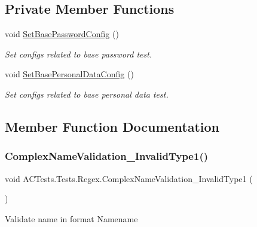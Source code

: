 \subsection*{Private Member Functions}
\begin{DoxyCompactItemize}
\item 
void \mbox{\hyperlink{class_a_c_tests_1_1_tests_1_1_regex_a718c10ab40c5e07d59790980bcdca01b}{Set\+Base\+Password\+Config}} ()
\begin{DoxyCompactList}\small\item\em Set configs related to base password test. \end{DoxyCompactList}\item 
void \mbox{\hyperlink{class_a_c_tests_1_1_tests_1_1_regex_a25d9c579fa5463bc64f843fbb5a9ea01}{Set\+Base\+Personal\+Data\+Config}} ()
\begin{DoxyCompactList}\small\item\em Set configs related to base personal data test. \end{DoxyCompactList}\end{DoxyCompactItemize}


\subsection{Member Function Documentation}
\mbox{\label{class_a_c_tests_1_1_tests_1_1_regex_aed8771049664094309007e7d9d57d8ef}} 
\subsubsection{\texorpdfstring{Complex\+Name\+Validation\+\_\+\+Invalid\+Type1()}{ComplexNameValidation\_InvalidType1()}}
{\footnotesize\ttfamily void A\+C\+Tests.\+Tests.\+Regex.\+Complex\+Name\+Validation\+\_\+\+Invalid\+Type1 (\begin{DoxyParamCaption}{ }\end{DoxyParamCaption})}



Validate name in format Name\textquotesingle{}name 

\mbox{\label{class_a_c_tests_1_1_tests_1_1_regex_a03bf0183457b42a3ee58797e4487e12c}} 
